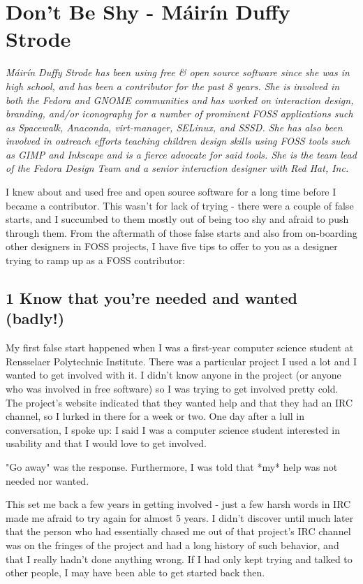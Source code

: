 \chapter{Don't Be Shy - Máirín Duffy Strode}

\textit{Máirín Duffy Strode has been using free \& open source software since she was in high
school, and has been a contributor for the past 8 years. She is involved in both
the Fedora and GNOME communities and has worked on  interaction design,
branding, and/or iconography for a number of prominent FOSS applications such as
Spacewalk, Anaconda, virt-manager, SELinux, and SSSD. She has also been involved
in outreach efforts teaching children design skills using FOSS tools such as
GIMP and Inkscape and is a fierce advocate for said tools. She is the team lead
of the Fedora Design Team and a senior interaction designer with Red Hat, Inc.}

I knew about and used free and open source software for a long time before I
became a contributor. This wasn't for lack of trying - there were a couple of
false starts, and I succumbed to them mostly out of being too shy and afraid to
push through them. From the aftermath of those false starts and also from
on-boarding other designers in FOSS projects, I have five tips to offer to you
as a designer trying to ramp up as a FOSS contributor:

\section*{1 Know that you're needed and wanted (badly!)}

My first false start happened when I was a first-year computer science student
at Rensselaer Polytechnic Institute. There was a particular project I used a lot
and I wanted to get involved with it. I didn't know anyone in the project (or
anyone who was involved in free software) so I was trying to get involved pretty
cold. The project's website indicated that they wanted help and that they had an
IRC channel, so I lurked in there for a week or two. One day after a lull in
conversation, I spoke up: I said I was a computer science student interested in
usability and that I would love to get involved.

"Go away" was the response. Furthermore, I was told that *my* help was not
needed nor wanted. 

This set me back a few years in getting involved - just a few harsh words in IRC
made me afraid to try again for almost 5 years.  I didn't discover until much
later that the person who had essentially chased me out of that project's IRC
channel was on the fringes of the project and had a long history of such
behavior, and that I really hadn't done anything wrong. If I had only kept
trying and talked to other people, I may have been able to get started back
then.

